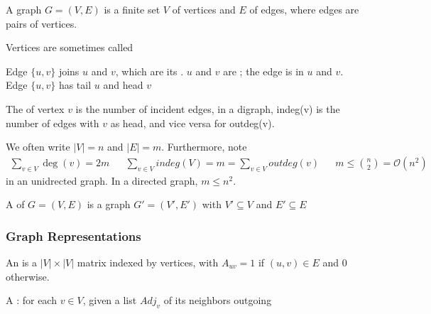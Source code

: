 \documentclass[12pt]{scrartcl}
\begin{document}
\begin{definition}
  A  graph $G = (V, E)$ is a finite set $V$ of vertices and 
  $E$ of edges, where edges are  pairs of vertices. 
\end{definition}

\begin{definition}
  Vertices are sometimes called 
\end{definition}

\begin{definition}
  Edge $\{u, v\}$ joins $u$ and $v$, which are its . $u$ and $v$ are 
  ; the edge is  in $u$ and $v$. Edge $\{u, v\}$ has 
  tail $u$ and head $v$
\end{definition}

\begin{definition}
  The  of vertex $v$ is the number of incident edges, in a digraph, 
  indeg(v) is the number of edges with $v$ as head, and vice versa for outdeg(v). 
\end{definition}

\begin{note}
  We often write $|V| = n$ and $|E| = m$. Furthermore, note 
  \begin{align*}
    \sum_{v \in V} \deg(v) = 2m && \sum_{v \in V} indeg(V) = m = \sum_{v \in V} outdeg(v) && m \leq \binom{n}{2} = \mathcal{O}(n^2)
  \end{align*}
  in an unidrected graph. In a directed graph, $m \leq n^2$. 
\end{note}

\begin{definition}
  A  of $G = (V, E)$ is a graph $G' = (V', E')$ with $V' \subseteq V$ and 
  $E' \subseteq E$ 
\end{definition}

\subsubsection{Graph Representations}

\begin{definition}
  An  is a $|V| \times |V|$ matrix indexed by vertices, with $A_{uv} = 1$ if $(u, v) \in E$ and $0$ otherwise. 
\end{definition}

\begin{definition}
  A : for each $v \in V$, given a list $Adj_v$ of its neighbors outgoing
\end{definition}
\end{document}
